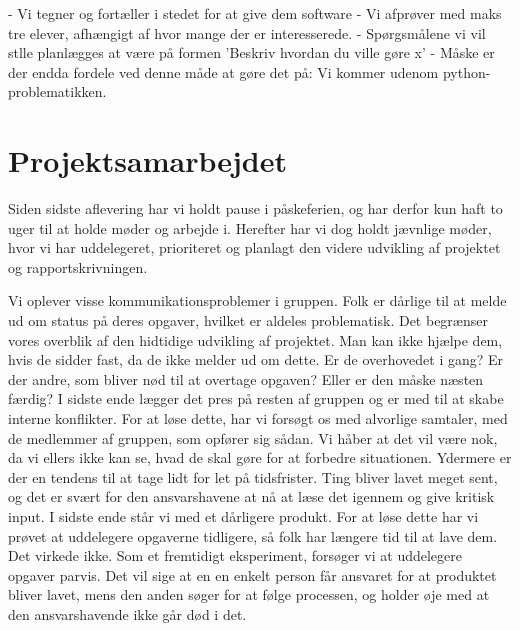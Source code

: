 \documentclass[10pt,a4paper,danish]{article}
\begin{document}
- Vi tegner og fortæller i stedet for at give dem software 
- Vi afprøver med maks tre elever, afhængigt af hvor mange der er interesserede. 
- Spørgsmålene vi vil stlle planlægges at være på formen 'Beskriv hvordan du ville gøre x'
- Måske er der endda fordele ved denne måde at gøre det på: Vi kommer udenom python-problematikken. 		

\section{Projektsamarbejdet}
Siden sidste aflevering har vi holdt pause i påskeferien, og har derfor kun haft to uger til at holde møder og arbejde i. Herefter har vi dog holdt jævnlige møder, hvor vi har uddelegeret, prioriteret og planlagt den videre udvikling af projektet og rapportskrivningen. 

Vi oplever visse kommunikationsproblemer i gruppen. Folk er dårlige til at melde ud om status på deres opgaver, hvilket er aldeles problematisk. Det begrænser vores overblik af den hidtidige udvikling af projektet. Man kan ikke hjælpe dem, hvis de sidder fast, da de ikke melder ud om dette. Er de overhovedet i gang? Er der andre, som bliver nød til at overtage opgaven? Eller er den måske næsten færdig? I sidste ende lægger det pres på resten af gruppen og er med til at skabe interne konflikter. For at løse dette, har vi forsøgt os med alvorlige samtaler, med de medlemmer af gruppen, som opfører sig sådan. Vi håber at det vil være nok, da vi ellers ikke kan se, hvad de skal gøre for at forbedre situationen. Ydermere er der en tendens til at tage lidt for let på tidsfrister. Ting bliver lavet meget sent, og det er svært for den ansvarshavene at nå at læse det igennem og give kritisk input. I sidste ende står vi med et dårligere produkt. For at løse dette har vi prøvet at uddelegere opgaverne tidligere, så folk har længere tid til at lave dem. Det virkede ikke. Som et fremtidigt eksperiment, forsøger vi at uddelegere opgaver parvis. Det vil sige at en en enkelt person får ansvaret for at produktet bliver lavet, mens den anden søger for at følge processen, og holder øje med at den ansvarshavende ikke går død i det.
\end{document}
